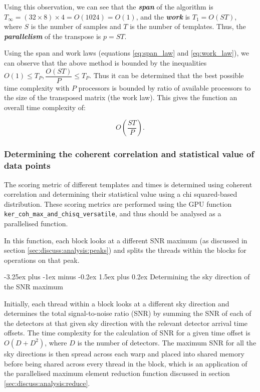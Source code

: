 \documentclass{article}
\makeatletter
\renewcommand{\paragraph}{\@startsection{paragraph}{4}{0ex}%
    {-3.25ex plus -1ex minus -0.2ex}%
    {1.5ex plus 0.2ex}%
    {\normalfont\normalsize\bfseries}}
\makeatother
\begin{document}
Using this observation, we can see that the \textit{\textbf{span}} of the algorithm is \(T_\infty = (32\times8)\times4 = O(1024) = O(1)\), and the \textit{\textbf{work}} is \(T_1 = O(ST)\), where \(S\) is the number of samples and \(T\) is the number of templates.
Thus, the \textit{\textbf{parallelism}} of the transpose is \(p = ST\).

Using the span and work laws (equations \ref{eq:span_law} and \ref{eq:work_law}), we can observe that the above method is bounded by the inequalities \(O(1) \leq T_P, \dfrac{O(ST)}{P} \leq T_P\).
Thus it can be determined that the best possible time complexity with \(P\) processors is bounded by ratio of available processors to the size of the transposed matrix (the work law).
This gives the function an overall time complexity of:

\[
    O(\dfrac{ST}{P}).
\]

\subsubsection{Determining the coherent correlation and statistical value of data points} \label{sec:discuss:analysis:coh_max_and_chisq_versatile}

The scoring metric of different templates and times is determined using coherent correlation and determining their statistical value using a chi squared-based distribution.
These scoring metrics are performed using the GPU function \texttt{ker\_coh\_max\_and\_chisq\_versatile}, and thus should be analysed as a parallelised function.

In this function, each block looks at a different SNR maximum (as discussed in section \ref{sec:discuss:analysis:peaks}) and splits the threads within the blocks for operations on that peak.

\paragraph{Determining the sky direction of the SNR maximum} \label{sec:discuss:analysis:skydir}

Initially, each thread within a block looks at a different sky direction and determines the total signal-to-noise ratio (SNR) by summing the SNR of each of the detectors at that given sky direction with the relevant detector arrival time offsets.
The time complexity for the calculation of SNR for a given time offset is \(O(D + D^2)\), where \(D\) is the number of detectors.
The maximum SNR for all the sky directions is then spread across each warp and placed into shared memory before being shared across every thread in the block, which is an application of the parallelised maximum element reduction function discussed in section \ref{sec:discuss:analysis:reduce}.
\\
\end{document}
